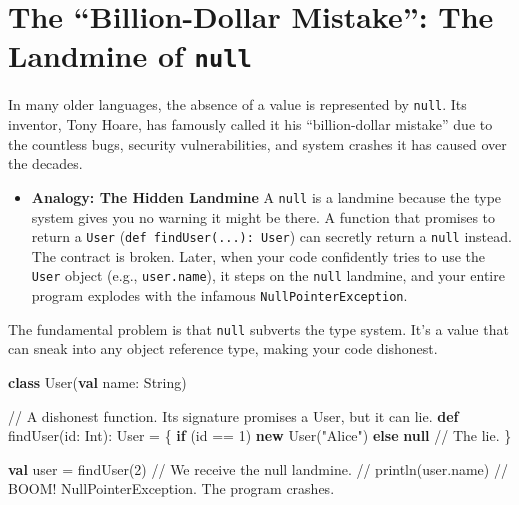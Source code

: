 \documentclass[
  letterpaper,
  DIV=11,
  numbers=noendperiod]{scrreprt}
\newenvironment{Shaded}{\begin{snugshade}}{\end{snugshade}}
\newcommand{\BuiltInTok}[1]{\textcolor[rgb]{0.00,0.23,0.31}{#1}}
\newcommand{\CommentTok}[1]{\textcolor[rgb]{0.37,0.37,0.37}{#1}}
\newcommand{\ControlFlowTok}[1]{\textcolor[rgb]{0.00,0.23,0.31}{\textbf{#1}}}
\newcommand{\DecValTok}[1]{\textcolor[rgb]{0.68,0.00,0.00}{#1}}
\newcommand{\ExtensionTok}[1]{\textcolor[rgb]{0.00,0.23,0.31}{#1}}
\newcommand{\FunctionTok}[1]{\textcolor[rgb]{0.28,0.35,0.67}{#1}}
\newcommand{\KeywordTok}[1]{\textcolor[rgb]{0.00,0.23,0.31}{\textbf{#1}}}
\newcommand{\NormalTok}[1]{\textcolor[rgb]{0.00,0.23,0.31}{#1}}
\newcommand{\OperatorTok}[1]{\textcolor[rgb]{0.37,0.37,0.37}{#1}}
\newcommand{\StringTok}[1]{\textcolor[rgb]{0.13,0.47,0.30}{#1}}
\providecommand{\tightlist}{%
  \setlength{\itemsep}{0pt}\setlength{\parskip}{0pt}}
\begin{document}
\section{\texorpdfstring{The ``Billion-Dollar Mistake'': The Landmine of
\texttt{null}}{The ``Billion-Dollar Mistake'': The Landmine of null}}\label{the-billion-dollar-mistake-the-landmine-of-null}

In many older languages, the absence of a value is represented by
\texttt{null}. Its inventor, Tony Hoare, has famously called it his
``billion-dollar mistake'' due to the countless bugs, security
vulnerabilities, and system crashes it has caused over the decades.

\begin{itemize}
\tightlist
\item
  \textbf{Analogy: The Hidden Landmine} A \texttt{null} is a landmine
  because the type system gives you no warning it might be there. A
  function that promises to return a \texttt{User}
  (\texttt{def\ findUser(...):\ User}) can secretly return a
  \texttt{null} instead. The contract is broken. Later, when your code
  confidently tries to use the \texttt{User} object (e.g.,
  \texttt{user.name}), it steps on the \texttt{null} landmine, and your
  entire program explodes with the infamous
  \texttt{NullPointerException}.
\end{itemize}

The fundamental problem is that \texttt{null} subverts the type system.
It's a value that can sneak into any object reference type, making your
code dishonest.

\begin{Shaded}
\begin{Highlighting}[]
\KeywordTok{class} \FunctionTok{User}\OperatorTok{(}\KeywordTok{val}\NormalTok{ name}\OperatorTok{:} \ExtensionTok{String}\OperatorTok{)}

\CommentTok{// A dishonest function. Its signature promises a User, but it can lie.}
\KeywordTok{def} \FunctionTok{findUser}\OperatorTok{(}\NormalTok{id}\OperatorTok{:} \BuiltInTok{Int}\OperatorTok{):}\NormalTok{ User }\OperatorTok{=} \OperatorTok{\{}
  \ControlFlowTok{if} \OperatorTok{(}\NormalTok{id }\OperatorTok{==} \DecValTok{1}\OperatorTok{)} \KeywordTok{new} \FunctionTok{User}\OperatorTok{(}\StringTok{"Alice"}\OperatorTok{)} \ControlFlowTok{else} \KeywordTok{null} \CommentTok{// The lie.}
\OperatorTok{\}}

\KeywordTok{val}\NormalTok{ user }\OperatorTok{=} \FunctionTok{findUser}\OperatorTok{(}\DecValTok{2}\OperatorTok{)} \CommentTok{// We receive the \textquotesingle{}null\textquotesingle{} landmine.}
\CommentTok{// println(user.name) // BOOM! NullPointerException. The program crashes.}
\end{Highlighting}
\end{Shaded}
\end{document}
